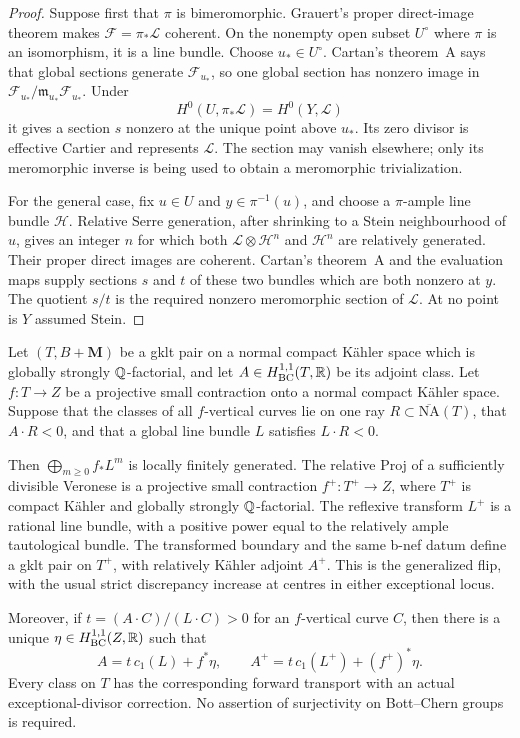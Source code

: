 \begin{proof}
Suppose first that $\pi$ is bimeromorphic. Grauert's proper direct-image
theorem makes $\mathcal F=\pi_*\mathcal L$ coherent. On the nonempty
open subset $U^\circ$ where $\pi$ is an isomorphism, it is a line bundle.
Choose $u_*\in U^\circ$. Cartan's theorem~A says that global sections
generate $\mathcal F_{u_*}$, so one global section has nonzero image in
$\mathcal F_{u_*}/\mathfrak m_{u_*}\mathcal F_{u_*}$.
Under
\[
 H^0(U,\pi_*\mathcal L)=H^0(Y,\mathcal L)
\]
it gives a section $s$ nonzero at the unique point above $u_*$.
Its zero divisor is effective Cartier and represents $\mathcal L$.
The section may vanish elsewhere; only its meromorphic inverse is
being used to obtain a meromorphic trivialization.

For the general case, fix $u\in U$ and $y\in\pi^{-1}(u)$, and choose
a $\pi$-ample line bundle $\mathcal H$. Relative Serre generation,
after shrinking to a Stein neighbourhood of $u$, gives an integer
$n$ for which both $\mathcal L\otimes\mathcal H^n$ and
$\mathcal H^n$ are relatively generated. Their proper direct images
are coherent. Cartan's theorem~A and the evaluation maps supply
sections $s$ and $t$ of these two bundles which are both nonzero at
$y$. The quotient $s/t$ is the required nonzero meromorphic section
of $\mathcal L$. At no point is $Y$ assumed Stein.
\end{proof}

\begin{proposition}
\label{prog:detected-flip}
Let $(T,B+\mathbf M)$ be a gklt pair on a normal compact K\"ahler
space which is globally strongly $\mathbb Q$-factorial, and let $A\in H^{1,1}_{\mathrm{BC}}(T,\mathbb R)$
be its adjoint class. Let $f:T\to Z$ be a projective small contraction
onto a normal compact K\"ahler space. Suppose that the classes of all
$f$-vertical curves lie on one ray $R\subset\overline{\mathrm{NA}}(T)$, that $A\cdot R<0$,
and that a global line bundle $L$ satisfies $L\cdot R<0$.

Then $\bigoplus_{m\geq0}f_*L^m$ is locally finitely generated. The
relative Proj of a sufficiently divisible Veronese is a projective
small contraction $f^+:T^+\to Z$, where $T^+$ is compact K\"ahler and
globally strongly $\mathbb Q$-factorial. The reflexive transform $L^+$ is a
rational line bundle, with a positive power equal to the relatively
ample tautological bundle. The transformed boundary and the same
b-nef datum define a gklt pair on $T^+$, with relatively K\"ahler
adjoint $A^+$. This is the generalized flip, with the usual
strict discrepancy increase at centres in either exceptional locus.

Moreover, if $t=(A\cdot C)/(L\cdot C)>0$ for an $f$-vertical curve $C$,
then there is a unique $\eta\in H^{1,1}_{\mathrm{BC}}(Z,\mathbb R)$ such that
\[
 A=t\,c_1(L)+f^*\eta,\qquad
 A^+=t\,c_1(L^+)+(f^+)^*\eta.
\]
Every class on $T$ has the corresponding forward transport with an
actual exceptional-divisor correction. No assertion of surjectivity
on Bott--Chern groups is required.
\end{proposition}

